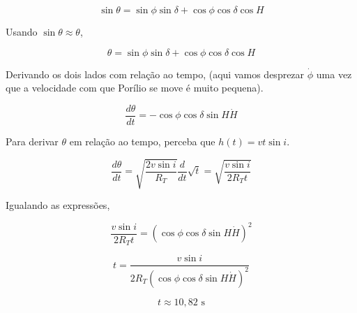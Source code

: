 \documentclass[11pt]{article}
\begin{document}
\begin{pproblem}
\begin{pssolution*}{}{ }
\begin{alternativas}
            \[\sin\theta = \sin\phi\sin\delta + \cos\phi\cos\delta\cos H\]

            Usando \(\sin\theta \approx \theta\), 

            \[\theta = \sin\phi\sin\delta + \cos\phi\cos\delta\cos H\]

            Derivando os dois lados com relação ao tempo, (aqui vamos desprezar \(\dot{\phi}\) uma vez que a velocidade com que Porílio se move é muito pequena).

            \[\frac{d\theta}{dt} = -\cos\phi\cos\delta\sin H \dot{H}\]

            Para derivar \(\theta\) em relação ao tempo, perceba que \(h(t) = v t \sin i\).

            \[\frac{d\theta}{dt} = \sqrt{\frac{2v\sin i }{R_T}}\frac{d}{dt}\sqrt{t} = \sqrt{\frac{v\sin i}{2 R_T t}}\]

            Igualando as expressões, 

            \[\frac{v\sin i}{2R_T t} = (\cos\phi\cos\delta\sin H \dot{H})^2\]

            \[t = \frac{v\sin i}{2R_T(\cos\phi\cos\delta\sin H \dot{H})^2}\]

            \[\boxed{t \approx 10,82 \text{ s}}\]

    \end{alternativas}
    
\end{pssolution*}
\end{pproblem}
\end{document}
